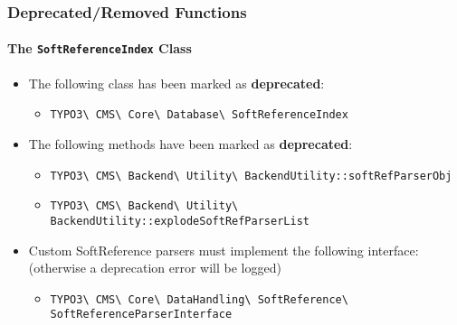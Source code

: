 %

\begin{frame}[fragile]
	\frametitle{Deprecated/Removed Functions}
	\framesubtitle{The \texttt{SoftReferenceIndex} Class}


	\begin{itemize}
		\item The following class has been marked as \textbf{deprecated}:
			\begin{itemize}\smaller
				\item \texttt{TYPO3\textbackslash
					CMS\textbackslash
					Core\textbackslash
					Database\textbackslash
					SoftReferenceIndex}
			\end{itemize}\normalsize
		\vspace{0.1cm}
		\item The following methods have been marked as \textbf{deprecated}:
			\begin{itemize}\smaller
				\item \texttt{TYPO3\textbackslash
					CMS\textbackslash
					Backend\textbackslash
					Utility\textbackslash
					BackendUtility::softRefParserObj}
				\item \texttt{TYPO3\textbackslash
					CMS\textbackslash
					Backend\textbackslash
					Utility\textbackslash
					BackendUtility::explodeSoftRefParserList}
			\end{itemize}\normalsize
		\vspace{0.1cm}
		\item Custom SoftReference parsers must implement the following interface:\newline
			\small(otherwise a deprecation error will be logged)\normalsize
				\begin{itemize}\smaller
					\item \fontsize{7}{9}\selectfont
					\texttt{TYPO3\textbackslash
						CMS\textbackslash
						Core\textbackslash
						DataHandling\textbackslash
						SoftReference\textbackslash
						SoftReferenceParserInterface}
			\end{itemize}\normalsize
	\end{itemize}

\end{frame}

